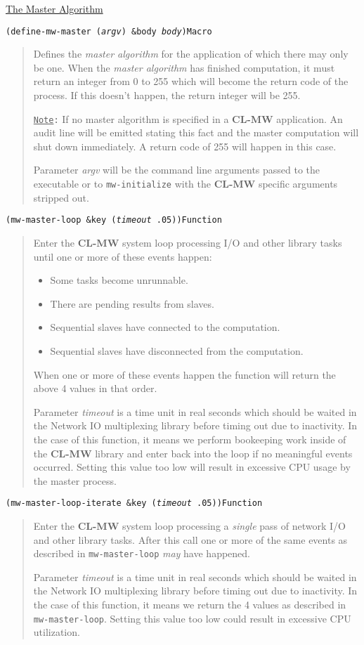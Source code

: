 \documentclass[titlepage,12pt]{book}
\newcommand{\xsmall}{\latexhtml{\small}{}}
\newcommand{\xnormalsize}{\latexhtml{\normalsize}{}}
\newcommand{\clmw}{\xsmall\textbf{CL-MW}\xnormalsize\xspace}
\newcommand{\ma}{\textit{master algorithm}\xspace}
\newcommand{\func}[1]{\xsmall\mbox{\uppercase{\texttt{#1}}}\xnormalsize\xspace}
\newcommand{\Note}{\texttt{\underline{Note}:}\xspace}
\newcommand{\apiheader}[1]{\begin{center}\underline{#1}\end{center}}
\newcommand{\apifunc}[2]{\noindent\xsmall\texttt{(#1)}\hspace*{\fill}\xnormalsize\texttt{#2}}
\newenvironment{apientry}[2]
	{\apifunc{#1}{#2}\begin{quotation}}
	{\end{quotation}}
\begin{document}
\apiheader{The Master Algorithm}
\begin{apientry}
{define-mw-master (\emph{argv}) \&body \emph{body}}
{Macro}
Defines the \ma for the application of which there may only be one.
When the \ma has finished computation, it must return an integer from 0 to 255
which will become the return code of the process. If this doesn't happen,
the return integer will be 255.

\Note If no master algorithm is specified in a \clmw application. An
audit line will be emitted stating this fact and the master computation
will shut down immediately. A return code of 255 will happen in
this case.

Parameter \emph{argv} will be the command line arguments passed to
the executable or to \func{mw-initialize} with the \clmw specific
arguments stripped out.
\end{apientry}

\begin{apientry}
{mw-master-loop \&key (\emph{timeout} .05)}
{Function}
Enter the \clmw system loop processing I/O and other library tasks until
one or more of these events happen:
\begin{itemize}
\item Some tasks become unrunnable.
\item There are pending results from slaves.
\item Sequential slaves have connected to the computation.
\item Sequential slaves have disconnected from the computation.
\end{itemize}

When one or more of these events happen the function will return the above
4 values in that order.

Parameter \emph{timeout} is a time unit in real seconds which should
be waited in the Network IO multiplexing library before timing out
due to inactivity.  In the case of this function, it means we perform
bookeeping work inside of the \clmw library and enter back into the
loop if no meaningful events occurred. Setting this value too low will
result in excessive CPU usage by the master process.

\end{apientry}

\begin{apientry}
{mw-master-loop-iterate \&key (\emph{timeout} .05)}
{Function}
Enter the \clmw system loop processing a \emph{single} pass of network
I/O and other library tasks. After this call one or more of the same events
as described in \func{mw-master-loop} \emph{may} have happened.

Parameter \emph{timeout} is a time unit in real seconds which should
be waited in the Network IO multiplexing library before timing out
due to inactivity.  In the case of this function, it means we return
the 4 values as described in \func{mw-master-loop}. Setting this value
too low could result in excessive CPU utilization.

\end{apientry}
\end{document}
